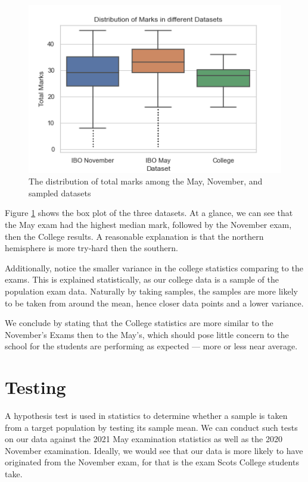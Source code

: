 \documentclass[a4paper,12pt]{tufte-handout}
\begin{document}
\begin{figure}
    \centering
    \includegraphics[width=\textwidth]{assets/total.png}
    \caption{The distribution of total marks among the May, November, and sampled datasets}
    \label{fig:dist}
\end{figure}

Figure \ref{fig:dist} shows the box plot of the three datasets. At a glance, we can see that the May exam had the highest median mark, followed by the November exam, then the College results. A reasonable explanation is that the northern hemisphere is more try-hard then the southern.

Additionally, notice the smaller variance in the college statistics comparing to the exams. This is explained statistically, as our college data is a sample of the population exam data. Naturally by taking samples, the samples are more likely to be taken from around the mean, hence closer data points and a lower variance.

We conclude by stating that the College statistics are more similar to the November's Exams then to the May's, which should pose little concern to the school for the students are performing as expected --- more or less near average.

\section{Testing}
A hypothesis test is used in statistics to determine whether a sample is taken from a target population by testing its sample mean. We can conduct such tests on our data against the 2021 May examination statistics as well as the 2020 November examination. Ideally, we would see that our data is more likely to have originated from the November exam, for that is the exam Scots College students take.
\end{document}
